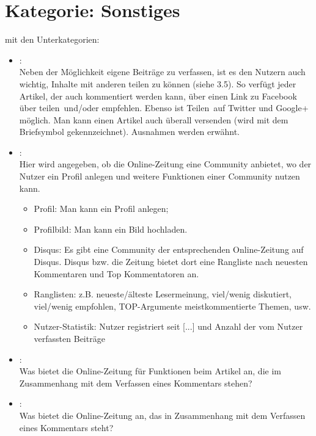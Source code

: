 \section{Kategorie: \glqq Sonstiges\grqq} 

mit den Unterkategorien:
\begin{itemize}[noitemsep]
  \item{}\grqq:\\
    Neben der Möglichkeit eigene Beiträge zu verfassen, ist es den Nutzern auch
    wichtig, Inhalte mit anderen teilen zu können (siehe 3.5). So verfügt jeder
    Artikel, der auch kommentiert werden kann, über einen Link zu Facebook über
    \glqq teilen\grqq\ und/oder \glqq empfehlen\grqq.  Ebenso ist \glqq
    Teilen\grqq\ auf Twitter und Google+ möglich. Man kann einen Artikel auch
    überall versenden (wird mit dem Briefsymbol gekennzeichnet). Ausnahmen
    werden erwähnt.

  \item{}\grqq:\\
    Hier wird angegeben, ob die Online-Zeitung eine Community anbietet, wo der
    Nutzer ein Profil anlegen und weitere Funktionen einer Community nutzen
    kann.
    \begin{itemize}[noitemsep]
      \item Profil: Man kann ein Profil anlegen;
      \item Profilbild: Man kann ein Bild hochladen.
      \item Disqus: Es gibt eine Community der entsprechenden Online-Zeitung auf
        Disqus. Disqus bzw.  die Zeitung bietet dort eine Rangliste nach \glqq
        neuesten Kommentaren\grqq{} und  \glqq Top Kommentatoren\grqq{} an.
      \item Ranglisten: z.B. neueste/älteste Lesermeinung, viel/\-we\-nig
        diskutiert, viel/we\-nig empfohlen, TOP-Argumente meistkommentierte
        Themen, usw.
      \item Nutzer-Statistik: Nutzer registriert seit [...] und
        Anzahl der vom Nutzer verfassten Beiträge
    \end{itemize}

  \item{}\grqq:\\
    Was bietet die Online-Zeitung für Funktionen beim Artikel an, die im
    Zusammenhang mit dem Verfassen eines Kommentars stehen?

  \item{}\grqq:\\
    Was bietet die Online-Zeitung an, das in Zusammenhang mit dem Verfassen
    eines Kommentars steht?
\end{itemize}


